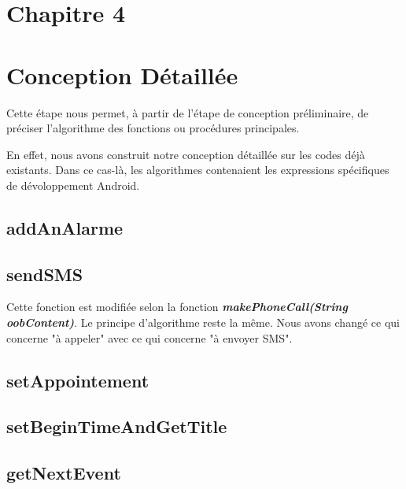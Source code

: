 \section*{Chapitre 4}
\section{Conception Détaillée}
\indent Cette étape nous permet, à partir de l'étape de conception préliminaire, de préciser l'algorithme des fonctions ou procédures principales.

\indent En effet, nous avons construit notre conception détaillée sur les codes déjà existants. Dans ce cas-là, les algorithmes contenaient les expressions spécifiques de dévoloppement Android.

\subsection{addAnAlarme}
	

\subsection{sendSMS}
	

	Cette fonction est modifiée selon la fonction \textbf{\emph{makePhoneCall(String oobContent)}}. Le principe d'algorithme reste la même. Nous avons changé ce qui concerne "à appeler" avec ce qui concerne "à envoyer SMS".

\subsection{setAppointement}
	

\subsection{setBeginTimeAndGetTitle}
	

\subsection{getNextEvent}
	

\newpage
